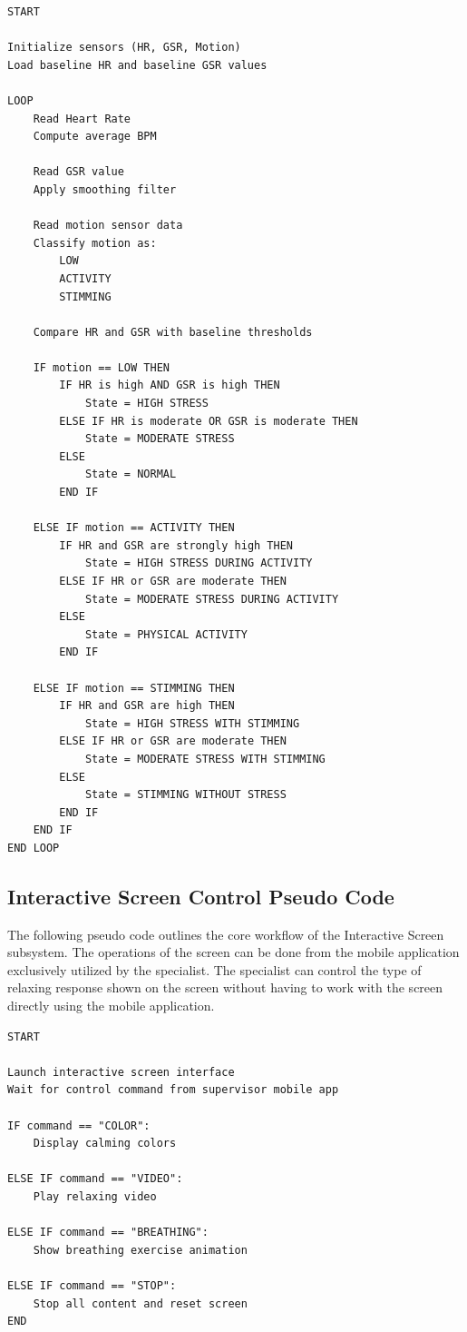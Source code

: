 \documentclass[a4paper,12pt]{report}
\begin{document}
\begin{tcolorbox}[colback=black!5!white, colframe=black!75!white, title=Pseudo Code for Stress Detection]
\begin{verbatim}
START

Initialize sensors (HR, GSR, Motion)
Load baseline HR and baseline GSR values

LOOP
    Read Heart Rate
    Compute average BPM

    Read GSR value
    Apply smoothing filter

    Read motion sensor data
    Classify motion as:
        LOW
        ACTIVITY
        STIMMING

    Compare HR and GSR with baseline thresholds

    IF motion == LOW THEN
        IF HR is high AND GSR is high THEN
            State = HIGH STRESS
        ELSE IF HR is moderate OR GSR is moderate THEN
            State = MODERATE STRESS
        ELSE
            State = NORMAL
        END IF

    ELSE IF motion == ACTIVITY THEN
        IF HR and GSR are strongly high THEN
            State = HIGH STRESS DURING ACTIVITY
        ELSE IF HR or GSR are moderate THEN
            State = MODERATE STRESS DURING ACTIVITY
        ELSE
            State = PHYSICAL ACTIVITY
        END IF

    ELSE IF motion == STIMMING THEN
        IF HR and GSR are high THEN
            State = HIGH STRESS WITH STIMMING
        ELSE IF HR or GSR are moderate THEN
            State = MODERATE STRESS WITH STIMMING
        ELSE
            State = STIMMING WITHOUT STRESS
        END IF
    END IF
END LOOP

\end{verbatim}
\end{tcolorbox}

\subsection{Interactive Screen Control Pseudo Code}
The following pseudo code outlines the core workflow of the Interactive Screen subsystem. The operations of the screen can be done from the mobile application exclusively utilized by the specialist. The specialist can control the type of relaxing response shown on the screen without having to work with the screen directly using the mobile application.
\begin{tcolorbox}[colback=black!5!white, colframe=black!75!white, title=Pseudo Code for Interactive Screen Control]
\begin{verbatim}
START

Launch interactive screen interface
Wait for control command from supervisor mobile app

IF command == "COLOR":
    Display calming colors

ELSE IF command == "VIDEO":
    Play relaxing video

ELSE IF command == "BREATHING":
    Show breathing exercise animation

ELSE IF command == "STOP":
    Stop all content and reset screen
END
\end{verbatim}
\end{tcolorbox}
\end{document}
